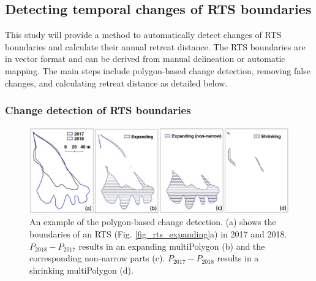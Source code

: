 \documentclass[authoryear,preprint,review,12pt]{elsarticle}
\begin{document}
\subsection{Detecting temporal changes of RTS boundaries}
\label{sec_detect_rts_changes}

This study will provide a method to automatically detect changes of RTS boundaries and calculate their annual retreat distance.
The RTS boundaries are in vector format and can be derived from manual delineation or automatic mapping. 
The main steps include polygon-based change detection, removing false changes, and calculating retreat distance as detailed below. 

\subsubsection{Change detection of RTS boundaries}
\label{sec_polygon_change_det}

\begin{figure} 
	\centering
	\includegraphics[width=14cm]{figs/rts_polygon_change_det_trim.jpg}
	\caption{An example of the polygon-based change detection. (a) shows the boundaries of an RTS (Fig. \ref{fig_rts_expanding}a) in 2017 and 2018. $P_{2018}-P_{2017}$ results in an expanding multiPolygon (b) and the corresponding non-narrow parts (c). $P_{2017}-P_{2018}$ results in a shrinking multiPolygon (d).}
	\label{fig_rts_change_det}
\end{figure}
\end{document}
